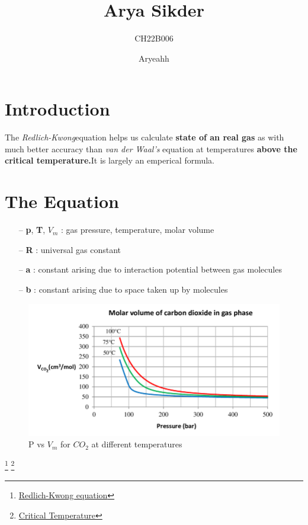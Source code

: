 \documentclass[pdftex]{article}
\title{Arya Sikder}
\author{CH22B006}
\date{Aryeahh}
\begin{document}
\maketitle
\section{Introduction}
The \textit{Redlich-Kwong}\footnotemark[1] equation helps us calculate \textbf{state of an real gas} as with much better accuracy than \textit{van der Waal's} equation at temperatures \textbf{above the critical temperature.}\footnotemark[2]  It is largely an emperical formula.
\section{The Equation}
\begin{center}
\end{center}
\begin{itemize}
    \item[--] \textbf{p}, \textbf{T}, \textbf{$V_m$} : gas pressure, temperature, molar volume
    \item[--] \textbf{R} : universal gas constant
    \item[--] \textbf{a} : constant arising due to interaction potential between gas molecules
    \item [--] \textbf{b} : constant arising due to space taken up by molecules
\end{itemize}

\begin{figure}[h]
    \centering
    \includegraphics[scale = 0.8]{Redlich-Kwong equation.png}
    {\caption{P vs $V_m$ for $CO_2$ at different temperatures}\label{fig:}}
\end{figure}

\footnote[1]
{\href{https://chem.libretexts.org/Courses/Colorado\_State\_University/Chem\_476\%3A\_Physical\_Chemistry\_II\_(Levinger)/Chapters/16\%3A\_The\_Properties\_of\_Gases/16.2\%3A\_van\_der\_Waals\_and\_Redlich-Kwong\_Equations}{Redlich-Kwong equation}}
\footnote[2]
{\href{https://chem.libretexts.org/Bookshelves/General\_Chemistry/Book\%3A\_General\_Chemistry\%3A\_Principles\_Patterns\_and\_Applications\_(Averill)/11\%3A\_Fluids/11.06\%3A\_Critical\_Temperature\_and\_Pressure}{Critical Temperature}}
\end{document}
